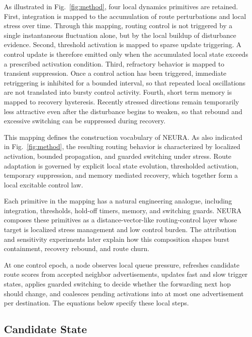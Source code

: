 \documentclass[5p,times]{elsarticle}
\begin{document}
As illustrated in Fig.~\ref{fig:method}, four local dynamics primitives are retained. First, integration is mapped to the accumulation of route perturbations and local stress over time. Through this mapping, routing control is not triggered by a single instantaneous fluctuation alone, but by the local buildup of disturbance evidence. Second, threshold activation is mapped to sparse update triggering. A control update is therefore emitted only when the accumulated local state exceeds a prescribed activation condition. Third, refractory behavior is mapped to transient suppression. Once a control action has been triggered, immediate retriggering is inhibited for a bounded interval, so that repeated local oscillations are not translated into bursty control activity. Fourth, short term memory is mapped to recovery hysteresis. Recently stressed directions remain temporarily less attractive even after the disturbance begins to weaken, so that rebound and excessive switching can be suppressed during recovery.

This mapping defines the construction vocabulary of NEURA. As also indicated in Fig.~\ref{fig:method}, the resulting routing behavior is characterized by localized activation, bounded propagation, and guarded switching under stress. Route adaptation is governed by explicit local state evolution, thresholded activation, temporary suppression, and memory mediated recovery, which together form a local excitable control law.

Each primitive in the mapping has a natural engineering analogue, including integration, thresholds, hold-off timers, memory, and switching guards. NEURA composes these primitives as a distance-vector-like routing-control layer whose target is localized stress management and low control burden. The attribution and sensitivity experiments later explain how this composition shapes burst containment, recovery rebound, and route churn.

At one control epoch, a node observes local queue pressure, refreshes candidate route scores from accepted neighbor advertisements, updates fast and slow trigger states, applies guarded switching to decide whether the forwarding next hop should change, and coalesces pending activations into at most one advertisement per destination. The equations below specify these local steps.

\subsection{Candidate State}
\end{document}
